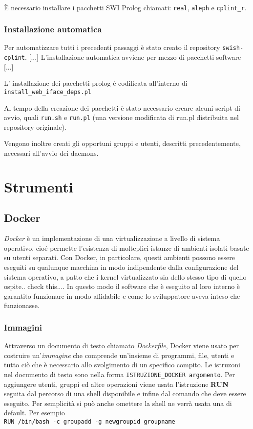 \documentclass[10pt,titlepage,twoside,a4paper]{report}
\begin{document}
~

È necessario installare i pacchetti SWI Prolog chiamati: \texttt{real}, 
\texttt{aleph} e \texttt{cplint\_r}.

        \subsection{Installazione automatica}
Per automatizzare tutti i precedenti passaggi è stato creato il repository
\texttt{swish-cplint}. [...] L'installazione automatica avviene per mezzo di pacchetti software [...]

L' installazione dei pacchetti prolog è codificata all'interno di 
\texttt{install\_web\_iface\_deps.pl}

Al tempo della creazione dei pacchetti è stato necessario creare alcuni
script di avvio, quali \texttt{run.sh} e \texttt{run.pl} (una versione 
modificata di run.pl distribuita nel repository originale).

Vengono inoltre creati gli opportuni gruppi e utenti, descritti 
precedentemente, necessari all'avvio dei daemons.



\chapter{Strumenti}


    \section{Docker}
\emph{Docker} è un implementazione di una virtualizzazione a livello di sistema 
operativo, cioé permette l'esistenza di molteplici istanze 
di ambienti isolati basate su utenti separati. Con Docker, in particolare, 
questi ambienti possono essere eseguiti su qualunque macchina in modo 
indipendente dalla configurazione del sistema operativo, a patto che i 
kernel virtualizzato sia dello stesso tipo di quello ospite.. check this.... In 
questo modo il software che è eseguito al loro interno è garantito funzionare 
in modo affidabile e come lo sviluppatore aveva inteso che funzionasse.
\cite{operatingSystemLevelVirtualization} \cite{docker}

        \subsection{Immagini}
Attraverso un documento di testo chiamato \emph{Dockerfile}, Docker viene 
usato per costruire un'\emph{immagine} che comprende un'insieme di 
programmi, file, utenti e tutto ciò che è necessario allo svolgimento di
un specifico compito. Le istruzoni nel documento di testo sono nella forma
\texttt{ISTRUZIONE_DOCKER argomento}. Per aggiungere utenti, 
gruppi ed altre operazioni viene usata l'istruzione \textbf{RUN} seguita dal 
percorso di una shell disponibile e infine dal comando che deve essere eseguito. Per 
semplicità si può anche omettere la shell ne verrà usata una di default. Per 
esempio \\
\texttt{RUN /bin/bash -c groupadd -g newgroupid groupname}
\end{document}
